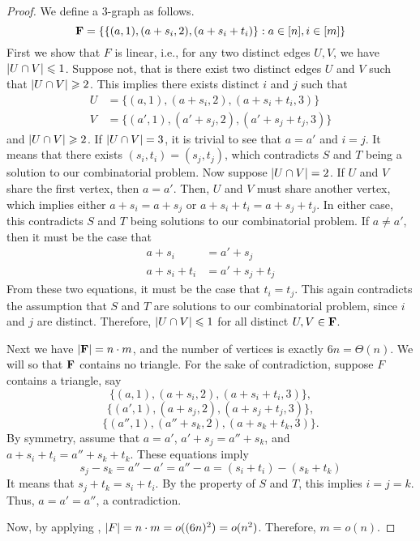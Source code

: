 \begin{proof}
	We define a 3-graph as follows. 
	$$ {\mathbf F} = \{ \{(a,1), (a+s_i, 2), (a + s_i + t_i)\} : a \in [n], i \in [m] \} $$
	First we show that $ F $ is linear, i.e., for any two distinct edges $ U,V $, we have $ \left\vert{U \cap V}\right\vert \leqslant 1 $. Suppose not, that is there exist two distinct edges $U$ and $V$ such that $\abs{U\intersect V} \geq 2$. This implies there exists distinct $i$ and $j$ such that
	\begin{align*}
		U &= \{ (a,1), (a+s_i,2), (a+s_i + t_i, 3) \}\\
		V &= \{ (a',1), (a'+s_j,2), (a'+s_j+t_j,3) \}
	\end{align*}
	and $\left\vert{U\cap V}\right\vert \geqslant 2$. If $\left\vert{U\cap V}\right\vert = 3$, it is trivial to see that $a=a'$ and $i=j$. It means that there exists $(s_i,t_i) = (s_j,t_j)$, which contradicts $S$ and $T$ being a solution to our combinatorial problem. Now suppose $\left\vert{U\cap V}\right\vert = 2$. If $U$ and $V$ share the first vertex, then $a = a'$. Then, $U$ and $V$ must share another vertex, which implies either $a+s_i = a+s_j$ or $a+s_i+t_i = a+s_j+t_j$. In either case, this contradicts $S$ and $T$ being solutions to our combinatorial problem. If $a\neq a'$, then it must be the case that
	\begin{align*}
		a+s_i &= a'+s_j\\
		a+s_i+t_i &= a'+s_j+t_j
	\end{align*}
	From these two equations, it must be the case that $t_i = t_j$. This again contradicts the assumption that $S$ and $T$ are solutions to our combinatorial problem, since $i$ and $j$ are distinct. Therefore, $\left\vert{U\cap V}\right\vert \leqslant 1$ for all distinct $U, V \in {\mathbf F}$.
	
	Next we have $ \left\vert{\ensuremath{{\mathbf F}}}\right\vert = n \cdot m$, and the number of vertices is exactly $6n = \Theta(n) $. We will so that $ {\mathbf F} $ contains no triangle. For the sake of contradiction, suppose $ F $ contains a triangle, say
	$$  \{ (a, 1), (a+s_i, 2), (a+ s_i + t_i, 3)\}, $$
	$$ \{ (a', 1), (a+s_j, 2), (a+ s_j + t_j, 3)\}, $$
	$$ \{ (a'', 1), (a''+s_k, 2), (a+ s_k + t_k, 3)\}. $$
	By symmetry, assume that $ a = a'$, $a' + s_j = a'' + s_k$, and $a + s_i+ t_i = a'' + s_k + t_k $.
	These equations imply
	$$ s_j - s_k = a'' - a' = a'' - a = (s_i + t_i) - (s_k + t_k)$$
	It means that $ s_j + t_k = s_i + t_i $. By the property of $ S $ and $ T $, this implies $  i = j = k $. Thus, $ a = a' = a'' $, a contradiction.
	
	Now, by applying , $ \left\vert{F}\right\vert = n \cdot m = o((6n)^2) = o(n^2) $. Therefore, $ m = o(n) $. 
\end{proof}


